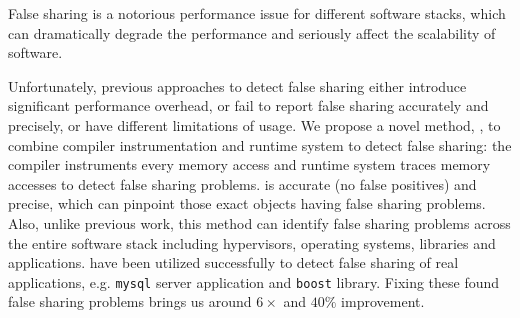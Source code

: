 
\begin{comment}
False sharing is notorious for performance degradation in multithreaded
programs. It apprears when two or more threads running on different cores periodically access 
different portions of data that can fit into one cache line. Since caching
system in a multicore processor needs to ensure a coherent view of memory
accross all cores, it has to grant an exclusive access
for each write operation by invidating duplicate copies in other cores. As a
result, frequent cache invalidation can seriously affect the scalability and
performance of multithreaded programs.
\end{comment} 

False sharing is a notorious performance issue for different software stacks, 
which can dramatically degrade the performance and seriously affect the scalability 
of software.

Unfortunately, previous approaches to detect false sharing
either introduce significant performance overhead, or fail
to report false sharing accurately and precisely, or have different limitations of usage. 
We propose a novel method, , to combine compiler instrumentation
and runtime system to detect false sharing: 
the compiler instruments every memory access and 
runtime system traces memory accesses to detect false sharing problems.
 is accurate (no false positives) and precise, which can pinpoint 
those exact objects having false sharing problems.
Also, unlike previous work, this method can
identify false sharing problems across the entire software stack including 
hypervisors, operating systems, libraries and applications. 
 have been utilized successfully to detect false sharing of real applications,
e.g. \texttt{mysql} server application and \texttt{boost} library. Fixing these found
false sharing problems brings us around $6\times$ and $40\%$ improvement.

